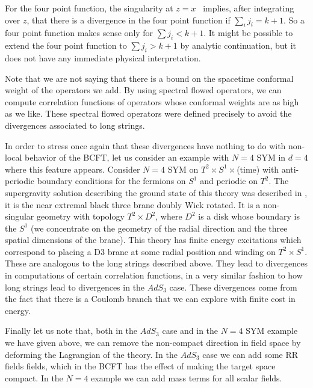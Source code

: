 For the four point function, the singularity at $z=x$ \sing\ implies,
after integrating over $z$, that there is a divergence in the
four point function if $\sum_i j_i  = k +1 $.
So a four point function makes sense only for $\sum j_i < k+1$.
It might be possible to
extend the four point function to $\sum j_i > k+1$
by analytic continuation, but it does not have any immediate
physical interpretation.

Note that we are not saying that there is a bound on the spacetime
conformal weight of the operators we add. By using spectral flowed
operators, we can compute correlation functions of operators whose
conformal weights are as high as we like.
These spectral flowed operators were defined
precisely to avoid the divergences associated to long strings.


In order to stress once again that these divergences have nothing to
do with non-local behavior of the BCFT, let us consider an example
with $N=4 $ SYM in $d=4$ where this feature appears. Consider
  $N=4 $ SYM on $T^2 \times S^1\times$(time)
 with anti-periodic boundary conditions
for the fermions on $S^1$ and periodic on $T^2$. The supergravity
solution describing the ground state of this
theory was described in \wittenthermal , it is the near extremal
black three brane doubly Wick rotated. It is a non-singular geometry
with topology $T^2 \times D^2$, where $D^2$ is a disk whose boundary is
the $S^1$ (we concentrate on the geometry of the radial direction
and the three spatial dimensions of the brane). This theory has
finite energy excitations which correspond to placing  a D3 brane
 at some radial position and winding on $T^2 \times S^1$. These
are analogous to the long strings described above. They  lead to
divergences in computations of certain correlation functions,
in a very similar fashion to how long strings lead to divergences
in the $AdS_3$ case. These divergences come from the fact that
there is a Coulomb branch  that we can explore
with finite cost in energy.


Finally let us note that, both in the $AdS_3$ case and in the $N=4$ SYM
example we have given above, we can remove the non-compact direction
in field space by deforming the Lagrangian of the theory. In the
$AdS_3$ case we can add some RR fields fields, which in the BCFT has
the effect of making the target space compact.
In the $N=4$ example we can add mass terms for all scalar fields.

